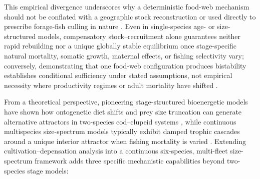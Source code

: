 \documentclass[11pt,letterpaper]{article}
\begin{document}
This empirical divergence underscores why a deterministic food-web mechanism should not be conflated with a geographic stock reconstruction or used directly to prescribe forage-fish culling in nature \citep{pikitch2014global,garcia2012reconsidering}. Even in single-species age- or size-structured models, compensatory stock--recruitment alone guarantees neither rapid rebuilding nor a unique globally stable equilibrium once stage-specific natural mortality, somatic growth, maternal effects, or fishing selectivity vary; conversely, demonstrating that one food-web configuration produces bistability establishes conditional sufficiency under stated assumptions, not empirical necessity where productivity regimes or adult mortality have shifted \citep{shelton2006fishing,swain2008predicted,lilly2013review}.

From a theoretical perspective, pioneering stage-structured bioenergetic models have shown how ontogenetic diet shifts and prey size truncation can generate alternative attractors in two-species cod--clupeid systems \citep{vanleeuwen2008how,gardmark2015regime}, while continuous multispecies size-spectrum models typically exhibit damped trophic cascades around a unique interior attractor when fishing mortality is varied \citep{andersen2010damped,datta2011stability,andersen2019fish}. Extending cultivation--depensation analysis into a continuous six-species, multi-fleet size-spectrum framework adds three specific mechanistic capabilities beyond two-species stage models:
\end{document}

